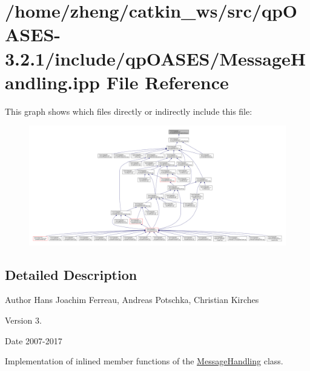 \hypertarget{_message_handling_8ipp}{}\section{/home/zheng/catkin\+\_\+ws/src/qp\+O\+A\+S\+E\+S-\/3.2.1/include/qp\+O\+A\+S\+E\+S/\+Message\+Handling.ipp File Reference}
\label{_message_handling_8ipp}
This graph shows which files directly or indirectly include this file\+:
\nopagebreak
\begin{figure}[H]
\begin{center}
\leavevmode
\includegraphics[width=350pt]{_message_handling_8ipp__dep__incl}
\end{center}
\end{figure}


\subsection{Detailed Description}
\begin{DoxyAuthor}{Author}
Hans Joachim Ferreau, Andreas Potschka, Christian Kirches 
\end{DoxyAuthor}
\begin{DoxyVersion}{Version}
3. 
\end{DoxyVersion}
\begin{DoxyDate}{Date}
2007-\/2017
\end{DoxyDate}
Implementation of inlined member functions of the \hyperlink{class_message_handling}{Message\+Handling} class. 